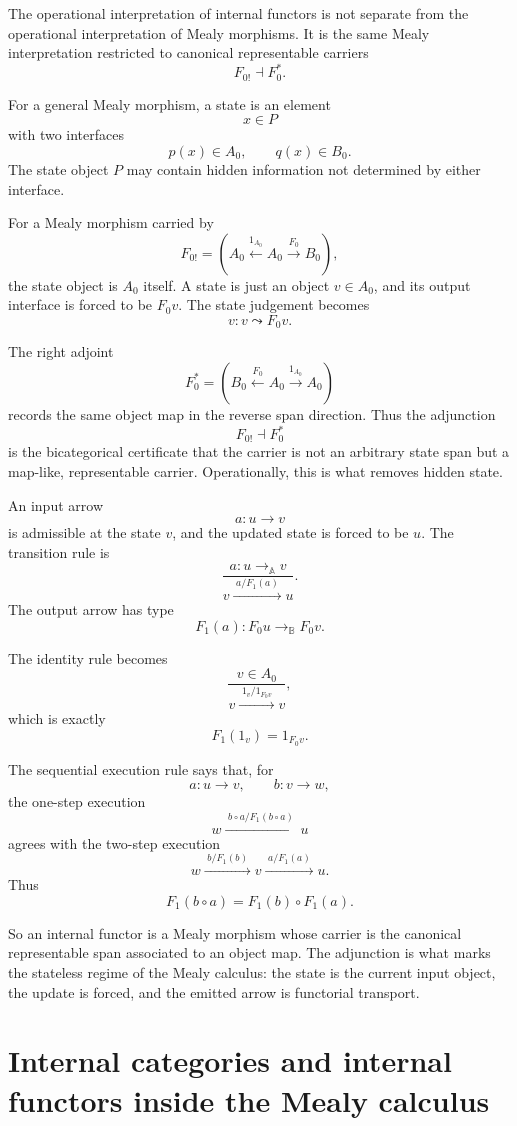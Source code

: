 The operational interpretation of internal functors is not separate from the operational interpretation of Mealy morphisms. It is the same Mealy interpretation restricted to canonical representable carriers
\[
F_{0!}\dashv F_0^\ast.
\]

For a general Mealy morphism, a state is an element
\[
x\in P
\]
with two interfaces
\[
p(x)\in A_0,
\qquad
q(x)\in B_0.
\]
The state object \(P\) may contain hidden information not determined by either interface.

For a Mealy morphism carried by
\[
F_{0!}
=
\left(
A_0
\xleftarrow{1_{A_0}}
A_0
\xrightarrow{F_0}
B_0
\right),
\]
the state object is \(A_0\) itself. A state is just an object \(v\in A_0\), and its output interface is forced to be \(F_0v\). The state judgement becomes
\[
v:v\leadsto F_0v.
\]

The right adjoint
\[
F_0^\ast
=
\left(
B_0
\xleftarrow{F_0}
A_0
\xrightarrow{1_{A_0}}
A_0
\right)
\]
records the same object map in the reverse span direction. Thus the adjunction
\[
F_{0!}\dashv F_0^\ast
\]
is the bicategorical certificate that the carrier is not an arbitrary state span but a map-like, representable carrier. Operationally, this is what removes hidden state.

An input arrow
\[
a:u\to v
\]
is admissible at the state \(v\), and the updated state is forced to be \(u\). The transition rule is
\[
\frac{
a:u\to_{\mathbb A}v
}
{
v
\xrightarrow{\;a/F_1(a)\;}
u
}.
\]
The output arrow has type
\[
F_1(a):F_0u\to_{\mathbb B}F_0v.
\]

The identity rule becomes
\[
\frac{
v\in A_0
}
{
v
\xrightarrow{\;1_v/1_{F_0v}\;}
v
},
\]
which is exactly
\[
F_1(1_v)=1_{F_0v}.
\]

The sequential execution rule says that, for
\[
a:u\to v,
\qquad
b:v\to w,
\]
the one-step execution
\[
w
\xrightarrow{\;b\circ a/F_1(b\circ a)\;}
u
\]
agrees with the two-step execution
\[
w
\xrightarrow{\;b/F_1(b)\;}
v
\xrightarrow{\;a/F_1(a)\;}
u.
\]
Thus
\[
F_1(b\circ a)=F_1(b)\circ F_1(a).
\]

So an internal functor is a Mealy morphism whose carrier is the canonical representable span associated to an object map. The adjunction is what marks the stateless regime of the Mealy calculus: the state is the current input object, the update is forced, and the emitted arrow is functorial transport.

\section{Internal categories and internal functors inside the Mealy calculus}
\label{sec:internal-functors-inside-mealy}

